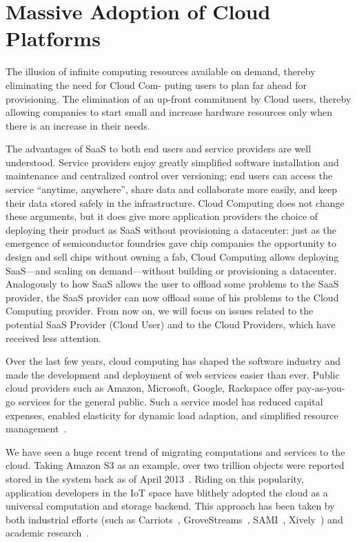 \section{Massive Adoption of Cloud Platforms}
\label{sec:cloud}

The illusion of infinite computing resources available on demand, thereby
eliminating the need for Cloud Com- puting users to plan far ahead for
provisioning.  The elimination of an up-front commitment by Cloud users, thereby
allowing companies to start small and increase hardware resources only when
there is an increase in their needs.

The advantages of SaaS to both end users and service providers are well
understood. Service providers enjoy greatly simplified software installation and
maintenance and centralized control over versioning; end users can access the
service “anytime, anywhere”, share data and collaborate more easily, and keep
their data stored safely in the infrastructure. Cloud Computing does not change
these arguments, but it does give more application providers the choice of
deploying their product as SaaS without provisioning a datacenter: just as the
emergence of semiconductor foundries gave chip companies the opportunity to
design and sell chips without owning a fab, Cloud Computing allows deploying
SaaS—and scaling on demand—without building or provisioning a
datacenter. Analogously to how SaaS allows the user to offload some problems to
the SaaS provider, the SaaS provider can now offload some of his problems to the
Cloud Computing provider. From now on, we will focus on issues related to the
potential SaaS Provider (Cloud User) and to the Cloud Providers, which have
received less attention.

Over the last few years, cloud computing has shaped the software industry and
made the development and deployment of web services easier than ever.  Public
cloud providers such as Amazon, Microsoft, Google, Rackspace offer pay-as-you-go
services for the general public.  Such a service model has reduced capital
expenses, enabled elasticity for dynamic load adaption, and simplified resource
management~\cite{armbrust2010view}.

We have seen a huge recent trend of migrating computations and services to the
cloud.  Taking Amazon S3 as an example, over two trillion objects were reported
stored in the system back as of April 2013~\cite{barr2013amazon}.  Riding on
this popularity, application developers in the IoT space have blithely adopted
the cloud as a universal computation and storage backend.  This approach has
been taken by both industrial efforts (such as Carriots~\cite{carriots},
GroveStreams~\cite{grovestreams}, SAMI~\cite{sami}, Xively~\cite{xively}) and
academic research~\cite{gupta2014bolt, zachariah1001internet}.

